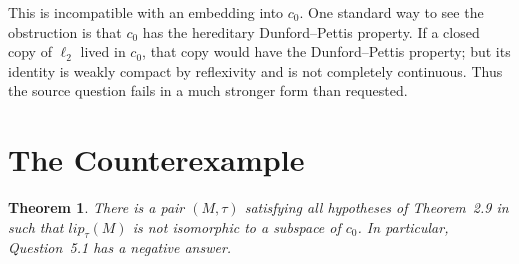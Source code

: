\documentclass[11pt]{article}
\newtheorem{theorem}{Theorem}
\begin{document}
This is incompatible with an embedding into $c_0$. One standard way to see
the obstruction is that $c_0$ has the hereditary Dunford--Pettis property.
If a closed copy of $\ell_2$ lived in $c_0$, that copy would have the
Dunford--Pettis property; but its identity is weakly compact by reflexivity
and is not completely continuous. Thus the source question fails in a much
stronger form than requested.

\section*{The Counterexample}

\begin{theorem}\label{thm:main}
There is a pair $(M,\tau)$ satisfying all hypotheses of Theorem~2.9 in
\cite{GPRZ} such that $lip_\tau(M)$ is not isomorphic to a subspace of $c_0$.
In particular, Question~5.1 has a negative answer.
\end{theorem}
\end{document}
